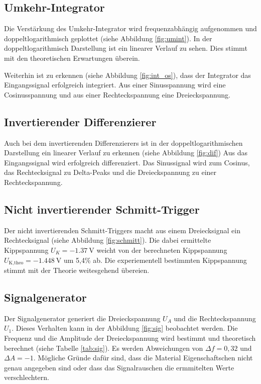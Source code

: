 \subsection{Umkehr-Integrator}
Die Verstärkung des Umkehr-Integrator wird frequenzabhängig aufgenommen 
und doppeltlogarithmisch geplottet (siehe Abbildung \ref{fig:umint}).
In der doppeltlogarithmisch Darstellung ist ein linearer Verlauf zu sehen.
Dies stimmt mit den theoretischen Erwartungen überein.
\newline \newline

Weiterhin ist zu erkennen (siehe Abbildung \ref{fig:int_os}), 
dass der Integrator das Eingangssignal erfolgreich integriert.
Aus einer Sinusspannung wird eine Cosinusspannung 
und aus einer Rechteckspannung eine Dreieckspannung.

\subsection{Invertierender Differenzierer}
Auch bei dem invertierenden Differenzierers ist in der doppeltlogarithmischen
Darstellung ein linearer Verlauf zu erkennen (siehe Abbildung \ref{fig:dif})
\newline \newline
\noindent Aus das Eingangssignal wird erfolgreich differenziert.
Das Sinussignal wird zum Cosinus, 
das Rechtecksignal zu Delta-Peaks und die Dreieckspannung zu einer Rechteckspannung.

\subsection{Nicht invertierender Schmitt-Trigger}
Der nicht invertierenden Schmitt-Triggers macht aus einem Dreiecksignal ein Rechtecksignal
(siehe Abbildung \ref{fig:schmitt}).
 Die dabei ermittelte Kippspannung 
$U_K = \qty{-1.37}{\V}$ weicht von der berechneten Kippspannung $U_\text{K,theo} = \qty{-1.448}{\V}$
um 5,4\% ab. 
Die experiementell bestimmten Kippspannung stimmt mit der Theorie weitesgehend übereien.

\subsection{Signalgenerator}
Der Signalgenerator generiert die Dreieckspannung $U_A$ und 
die Rechteckspannung $U_1$.
Dieses Verhalten kann in der Abbildung \ref{fig:sig} beobachtet werden.
Die Frequenz und die Amplitude der Dreieckspannung wird bestimmt und theoretisch berechnet
(siehe Tabelle \ref{tab:sig}).
Es werden Abweichungen von $\Delta f = 0,32$ und $\Delta A = -1$.
Mögliche Gründe dafür sind,
dass die Material Eigenschaftschen nicht genau angegeben sind
oder dass das Signalrauschen die ermmitelten Werte verschlechtern.
